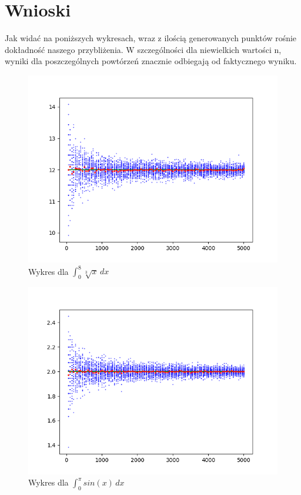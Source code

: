 \documentclass[12pt]{report}
\begin{document}
\author{Jakub Ogrodowczyk}
\section*{Wnioski}

Jak widać na poniższych wykresach, wraz z ilością generowanych punktów
rośnie dokładność naszego przybliżenia. W szczególności dla niewielkich wartości
n, wyniki dla poszczególnych powtórzeń znacznie odbiegają od faktycznego wyniku.

\begin{figure}[h]
\centering
\includegraphics{sqrt3x.png}
\caption[Example .]{Wykres dla \(\int_{0}^{8} \sqrt[3]{x} \,dx\)}
\label{...}
\end{figure}

\begin{figure}[h]
\centering
\includegraphics{sinx.png}
\caption[Example .]{Wykres dla \(\int_{0}^{\pi} sin(x) \,dx\)}
\label{...}
\end{figure}
    
\end{document}
